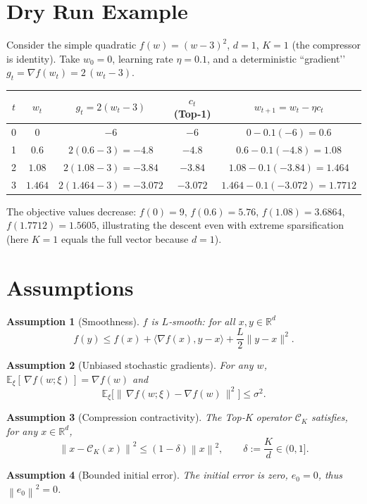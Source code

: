 \documentclass{article}
\newtheorem{assumption}{Assumption}
\newcommand{\E}{\mathbb{E}}
\newcommand{\norm}[1]{\left\lVert #1\right\rVert}
\newcommand{\C}{\mathcal{C}}
\begin{document}
\section*{Dry Run Example}
Consider the simple quadratic $f(w)=(w-3)^{2}$, $d=1$, $K=1$ (the compressor is identity).  
Take $w_{0}=0$, learning rate $\eta=0.1$, and a deterministic ``gradient’’ $g_{t}= \nabla f(w_{t})=2\,(w_{t}-3)$.  

\begin{center}
\begin{tabular}{c|c|c|c|c}
$t$ & $w_{t}$ & $g_{t}=2(w_{t}-3)$ & $c_{t}$ (Top‑1) & $w_{t+1}=w_{t}-\eta c_{t}$\\ \hline
0 & $0$ & $-6$ & $-6$ & $0-0.1(-6)=0.6$\\
1 & $0.6$ & $2(0.6-3)=-4.8$ & $-4.8$ & $0.6-0.1(-4.8)=1.08$\\
2 & $1.08$ & $2(1.08-3)=-3.84$ & $-3.84$ & $1.08-0.1(-3.84)=1.464$\\
3 & $1.464$ & $2(1.464-3)=-3.072$ & $-3.072$ & $1.464-0.1(-3.072)=1.7712$
\end{tabular}
\end{center}
The objective values decrease:
$f(0)=9$, $f(0.6)=5.76$, $f(1.08)=3.6864$, $f(1.7712)=1.5605$,
illustrating the descent even with extreme sparsification (here $K=1$ equals the full vector because $d=1$).

\newpage
\section*{Assumptions}
\begin{assumption}[Smoothness]\label{as:smooth}
$f$ is $L$‑smooth: for all $x,y\in\mathbb{R}^{d}$
\[
    f(y)\le f(x)+\langle \nabla f(x),y-x\rangle+\frac{L}{2}\|y-x\|^{2}.
\]
\end{assumption}
\begin{assumption}[Unbiased stochastic gradients]\label{as:unbiased}
For any $w$, $\E_{\xi}[\,\nabla f(w;\xi)\,]=\nabla f(w)$ and
\[
    \E_{\xi}\bigl[\|\,\nabla f(w;\xi)-\nabla f(w)\,\|^{2}\bigr]\le\sigma^{2}.
\]
\end{assumption}
\begin{assumption}[Compression contractivity]\label{as:contract}
The Top‑K operator $\C_{K}$ satisfies, for any $x\in\mathbb{R}^{d}$,
\[
    \norm{x-\C_{K}(x)}^{2}\le (1-\delta)\norm{x}^{2},\qquad 
    \delta:=\frac{K}{d}\in(0,1].
\]
\end{assumption}
\begin{assumption}[Bounded initial error]\label{as:error}
The initial error is zero, $e_{0}=0$, thus $\norm{e_{0}}^{2}=0$.
\end{assumption}
\end{document}
